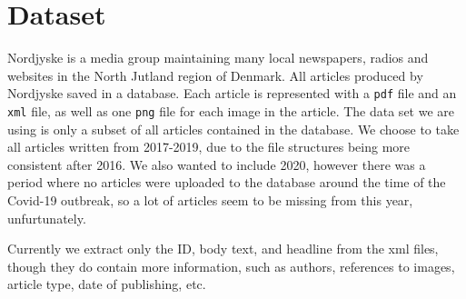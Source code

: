 \section{Dataset}
Nordjyske is a media group maintaining many local newspapers, radios and websites in the North Jutland region of Denmark.
All articles produced by Nordjyske saved in a database.
Each article is represented with a \texttt{pdf} file and an \texttt{xml} file, as well as one \texttt{png} file for each image in the article.
The data set we are using is only a subset of all articles contained in the database.
We choose to take all articles written from 2017-2019, due to  the file structures being more consistent after 2016.
We also wanted to include 2020, however there was a period where no articles were uploaded to the database around the time of the Covid-19 outbreak, so a lot of articles seem to be missing from this year, unfurtunately.

Currently we extract only the ID, body text, and headline from the xml files, though they do contain more information, such as authors, references to images, article type, date of publishing, etc.